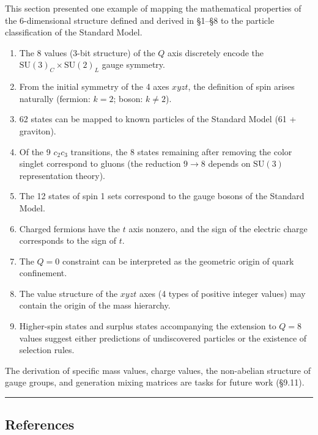 \documentclass[
  a4paper,11pt]{article}
\providecommand{\tightlist}{%
  \setlength{\itemsep}{0pt}\setlength{\parskip}{0pt}}
\theoremstyle{definition}
\theoremstyle{remark}
\begin{document}
This section presented one example of mapping the mathematical
properties of the 6-dimensional structure defined and derived in §1--§8
to the particle classification of the Standard Model.

\begin{enumerate}
\def\labelenumi{\arabic{enumi}.}
\tightlist
\item
  The 8 values (3-bit structure) of the \(Q\) axis discretely encode the
  \(\mathrm{SU}(3)_C \times \mathrm{SU}(2)_L\) gauge symmetry.
\item
  From the initial symmetry of the 4 axes \(xyzt\), the definition of
  spin arises naturally (fermion: \(k = 2\); boson: \(k \neq 2\)).
\item
  62 states can be mapped to known particles of the Standard Model (61 +
  graviton).
\item
  Of the 9 \(c_2 c_3\) transitions, the 8 states remaining after
  removing the color singlet correspond to gluons (the reduction
  \(9 \to 8\) depends on \(\mathrm{SU}(3)\) representation theory).
\item
  The 12 states of spin 1 sets correspond to the gauge bosons of the
  Standard Model.
\item
  Charged fermions have the \(t\) axis nonzero, and the sign of the
  electric charge corresponds to the sign of \(t\).
\item
  The \(Q = 0\) constraint can be interpreted as the geometric origin of
  quark confinement.
\item
  The value structure of the \(xyzt\) axes (4 types of positive integer
  values) may contain the origin of the mass hierarchy.
\item
  Higher-spin states and surplus states accompanying the extension to
  \(Q = 8\) values suggest either predictions of undiscovered particles
  or the existence of selection rules.
\end{enumerate}

The derivation of specific mass values, charge values, the non-abelian
structure of gauge groups, and generation mixing matrices are tasks for
future work (§9.11).

\begin{center}\rule{0.5\linewidth}{0.5pt}\end{center}

\subsection{References}\label{references}
\end{document}
